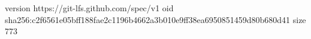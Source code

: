 version https://git-lfs.github.com/spec/v1
oid sha256:c2f6561e05bff188fae2c1196b4662a3b010e9ff38ea6950851459d80b680d41
size 773
